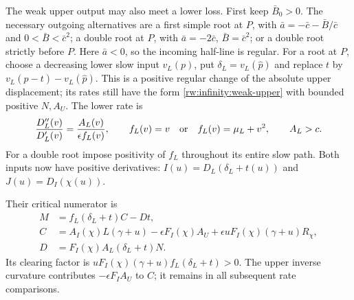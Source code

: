 The weak upper output may also meet a lower loss. First keep
$\bar B_0>0$. The necessary outgoing alternatives are
a first simple root at $P$, with
$\bar a=-\bar c-\bar B/\bar c$ and $0<\bar B<\bar c^2$;
a double root at $P$, with $\bar a=-2\bar c$,
$\bar B=\bar c^2$; or a double root strictly before $P$.
Here $\bar a<0$, so the incoming half-line is regular.
For a root at $P$, choose a decreasing lower slow input $v_L(p)$,
put $\delta_L=v_L(\widehat p)$ and replace $t$ by
$v_L(\widehat p-t)-v_L(\widehat p)$. This is a positive regular
change of the absolute upper displacement; its rates still have the
form \eqref{rw:infinity:weak-upper} with bounded positive $N,A_U$.
The lower rate is
\[
 \frac{D_L''(v)}{D_L'(v)}=\frac{A_L(v)}{\epsilon f_L(v)},\qquad
 f_L(v)=v\quad\hbox{or}\quad f_L(v)=\mu_L+v^2,
 \qquad A_L>c.
\]
For a double root impose positivity of $f_L$ throughout its entire
slow path. Both inputs now have positive derivatives:
$I(u)=D_L(\delta_L+t(u))$ and $J(u)=D_I(\chi(u))$.

Their critical numerator is
\begin{equation}\label{rw:infinity:weak-loss-numerator}
\begin{aligned}
 M&=f_L(\delta_L+t)C-Dt,\\
 C&=A_I(\chi)L(\gamma+u)-\epsilon F_I(\chi)A_U
             +\epsilon uF_I(\chi)(\gamma+u)R_\chi,\\
 D&=F_I(\chi)A_L(\delta_L+t)N.
\end{aligned}
\end{equation}
Its clearing factor is $uF_I(\chi)(\gamma+u)f_L(\delta_L+t)>0$.
The upper inverse curvature contributes $-\epsilon F_I A_U$ to
$C$; it remains in all subsequent rate comparisons.

